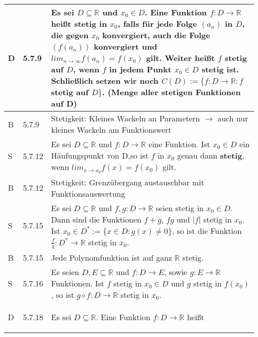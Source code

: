\begin{longtable}{p{0.75cm} p{1cm} p{16cm}}
        \toprule

        D   & 5.7.9 &   Es sei $D \subseteq \mathbb{R}$ und $x_0 \in D$. Eine Funktion $f : D \rightarrow \mathbb{R}$ heißt
                        \textbf{stetig} in $x_0$, falls für jede Folge $(a_n)$ in $D$, die gegen $x_0$ konvergiert, auch die Folge $(f(a_n))$ 
                        konvergiert und $lim_{n \rightarrow \infty} f(a_n) = f(x_0)$ gilt. \hfill \break 
                        Weiter heißt $f$ stetig auf $D$, wenn $f$ in jedem Punkt $x_0 \in D$ stetig ist. \hfill \break
                        Schließlich setzen wir noch $C(D) := \{f:D \rightarrow \mathbb{R}: f$ stetig auf $D\}$. 
                        (Menge aller stetigen Funktionen auf D) \\
        \midrule
        B   & 5.7.9 &   Stetigkeit: Kleines Wackeln an Parametern $\rightarrow$ auch nur kleines Wackeln am Funktionswert \\
        \midrule
        S   & 5.7.12&   Es sei $D \subseteq \mathbb{R}$ und $f : D \rightarrow \mathbb{R}$ eine Funktion. Ist $x_0 \in D$ ein Häufungspunkt
                        von D,so ist $f$ in $x_0$ genau dann \textbf{stetig}, wenn $lim_{x \rightarrow x_0} f(x) = f(x_0)$ gilt. \\
        \midrule
        B   & 5.7.12&   Stetigkeit: Grenzübergang austauschbar mit Funktionsauswertung \\
        \midrule
        S   & 5.7.15&   Es sei $D \subseteq \mathbb{R}$ und $f,g : D \rightarrow \mathbb{R}$ seien stetig in $x_0 \in D$. Dann sind die
                        Funktionen $f+g$, $fg$ und $|f|$ stetig in $x_0$. \hfill \break
                        Ist $x_0 \in D^* := \{ x \in D: g(x) \neq 0\}$, so ist die Funktion $\frac{f}{q}:D^* \rightarrow \mathbb{R}$ stetig in $x_0$.\\
        \midrule
        B   & 5.7.15&   Jede Polynomfunktion ist auf ganz $\mathbb{R}$ stetig. \\
        \midrule
        S   & 5.7.16&   Es seien $D,E \subseteq \mathbb{R}$ und $f: D \rightarrow E$, sowie $g: E \rightarrow \mathbb{R}$ Funktionen. Ist $f$ 
                        stetig in $x_0 \in D$ und $g$ stetig in $f(x_0)$, so ist $g \circ f: D \rightarrow \mathbb{R}$ stetig in $x_0$. \\ 
        \midrule
        D   & 5.7.18&   Es sei $D \subseteq \mathbb{R}$. Eine Funktion $f: D \rightarrow \mathbb{R}$ heißt
                        \begin{itemize}[topsep=-0.5cm]

\end{itemize}
\end{longtable}
